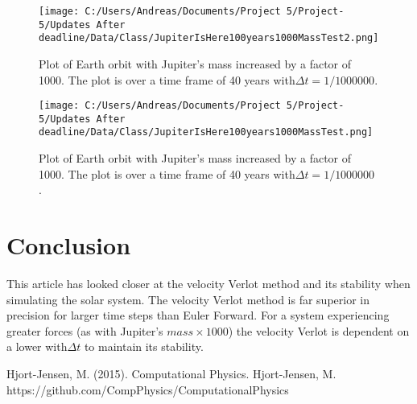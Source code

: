 \documentclass[twoside,twocolumn]{article}
\begin{document}
\begin{figure}[H]  \texttt{[image: C:/Users/Andreas/Documents/Project 5/Project-5/Updates After deadline/Data/Class/JupiterIsHere100years1000MassTest2.png]}
  \caption{Plot of Earth orbit with Jupiter's mass increased by a factor of 1000. The plot is over a time frame of 40 years with$\Delta t = 1/1000000$.}
  \label{fig:boat2}
\end{figure}
\begin{figure}[H]  \texttt{[image: C:/Users/Andreas/Documents/Project 5/Project-5/Updates After deadline/Data/Class/JupiterIsHere100years1000MassTest.png]}
  \caption{Plot of Earth orbit with Jupiter's mass increased by a factor of 1000. The plot is over a time frame of 40 years with$\Delta t = 1/1000000$ .}
  \label{fig:boat2}
\end{figure}

\section{Conclusion}
This article has looked closer at the velocity Verlot method and its stability when simulating the solar system. The velocity Verlot method is far superior in precision for larger time steps than Euler Forward. For a system experiencing greater forces (as with Jupiter's $mass\times 1000$) the velocity Verlot is dependent on a lower with$\Delta t$ to maintain its stability.

\begin{thebibliography}{99} %
Hjort-Jensen, M. (2015).
\newblock Computational Physics.
Hjort-Jensen, M.
\newblock https://github.com/CompPhysics/ComputationalPhysics

 
\end{thebibliography}

\end{document}

